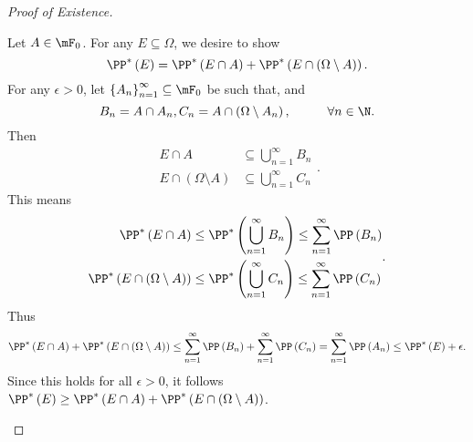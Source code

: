 \documentclass[stat901]{subfiles}
\begin{document}
\begin{proof}[Proof of Existence]
\begin{itemize}
                \begin{subproof}
                    Let $A\in\mF_0$. For any $E\subseteq\Omega$, we desire to show
                    \begin{equation*}
                        \PP^{*}\left( E \right) = \PP^{*}\left( E\cap A \right) + \PP^{*}\left( E\cap \left( \Omega\setminus A \right) \right).
                    \end{equation*}
                    For any $\epsilon>0$, let $\left\lbrace A_n \right\rbrace^{\infty}_{n=1}\subseteq\mF_0$ be such that, and
                    \begin{equation*}
                        B_n = A\cap A_n, C_n = A\cap\left( \Omega\setminus A_n \right),\hspace{1cm}\forall n\in\N.
                    \end{equation*}
                    Then
                    \begin{equation*}
                        \begin{aligned}
                            E\cap A & \subseteq \bigcup^{\infty}_{n=1} B_n \\
                            E\cap\left(\Omega\setminus A\right) & \subseteq \bigcup^{\infty}_{n=1} C_n
                        \end{aligned} .
                    \end{equation*}
                    This means
                    \begin{equation*}
                        \begin{aligned}
                            \PP^{*}\left( E\cap A \right)&\leq\PP^{*}\left( \bigcup^{\infty}_{n=1}B_n \right) \leq \sum^{\infty}_{n=1} \PP\left( B_n \right) \\
                            \PP^{*}\left( E\cap\left( \Omega\setminus A \right)\right)&\leq\PP^{*}\left( \bigcup^{\infty}_{n=1}C_n \right) \leq \sum^{\infty}_{n=1} \PP\left( C_n \right)
                        \end{aligned} .
                    \end{equation*}
                    Thus
                    \begin{equation*}
                        \PP^{*}\left( E\cap A \right) + \PP^{*}\left( E\cap \left( \Omega\setminus A \right) \right) \leq \sum^{\infty}_{n=1} \PP\left( B_n \right) + \sum^{\infty}_{n=1} \PP\left( C_n \right) = \sum^{\infty}_{n=1}\PP\left( A_n \right) \leq \PP^{*}\left( E \right)+\epsilon.
                    \end{equation*}
                    Since this holds for all $\epsilon>0$, it follows $\PP^{*}\left( E \right)\geq\PP^{*}\left( E\cap A \right)+\PP^{*}\left( E\cap\left( \Omega\setminus A \right) \right)$.


\end{subproof}
\end{itemize}
\end{proof}
\end{document}
